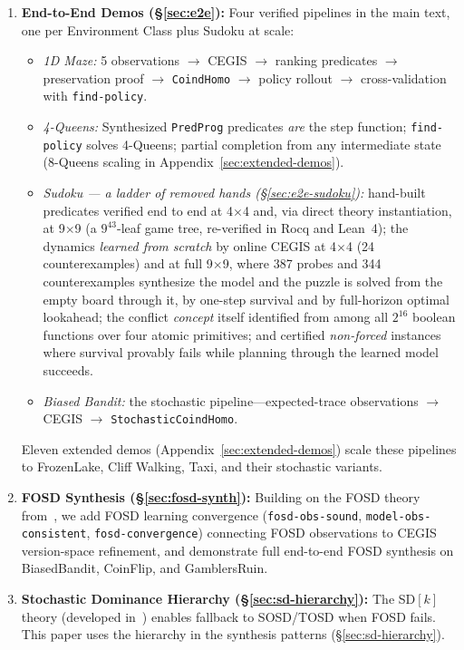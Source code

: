 \documentclass[9pt,a4paper]{article}
\theoremstyle{plain}
\theoremstyle{definition}
\theoremstyle{remark}
\begin{document}
\begin{enumerate}
\item \textbf{End-to-End Demos (\S\ref{sec:e2e}):} Four verified pipelines in the main text, one per Environment Class plus Sudoku at scale:
\begin{itemize}
\item \emph{1D Maze:} 5 observations $\to$ CEGIS $\to$ ranking predicates $\to$ preservation proof $\to$ \texttt{CoindHomo} $\to$ policy rollout $\to$ cross-validation with \texttt{find-policy}.
\item \emph{4-Queens:} Synthesized \texttt{PredProg} predicates \emph{are} the step function; \texttt{find-policy} solves 4-Queens; partial completion from any intermediate state (8-Queens scaling in Appendix~\ref{sec:extended-demos}).
\item \emph{Sudoku --- a ladder of removed hands (\S\ref{sec:e2e-sudoku}):} hand-built predicates verified end to end at 4$\times$4 and, via direct theory instantiation, at 9$\times$9 (a $9^{43}$-leaf game tree, re-verified in Rocq and Lean~4); the dynamics \emph{learned from scratch} by online CEGIS at 4$\times$4 (24 counterexamples) and at full 9$\times$9, where 387 probes and 344 counterexamples synthesize the model and the puzzle is solved from the empty board through it, by one-step survival and by full-horizon optimal lookahead; the conflict \emph{concept} itself identified from among all $2^{16}$ boolean functions over four atomic primitives; and certified \emph{non-forced} instances where survival provably fails while planning through the learned model succeeds.
\item \emph{Biased Bandit:} the stochastic pipeline---expected-trace observations $\to$ CEGIS $\to$ \texttt{StochasticCoindHomo}.
\end{itemize}
Eleven extended demos (Appendix~\ref{sec:extended-demos}) scale these pipelines to FrozenLake, Cliff Walking, Taxi, and their stochastic variants.

\item \textbf{FOSD Synthesis (\S\ref{sec:fosd-synth}):} Building on the FOSD theory from~\cite{CSHRLSuccessor}, we add FOSD learning convergence (\texttt{fosd-obs-sound}, \texttt{model-obs-consistent}, \texttt{fosd-convergence}) connecting FOSD observations to CEGIS version-space refinement, and demonstrate full end-to-end FOSD synthesis on BiasedBandit, CoinFlip, and GamblersRuin.

\item \textbf{Stochastic Dominance Hierarchy (\S\ref{sec:sd-hierarchy}):} The SD$[k]$ theory (developed in~\cite{CSHRLSuccessor}) enables fallback to SOSD/TOSD when FOSD fails.  This paper uses the hierarchy in the synthesis patterns (\S\ref{sec:sd-hierarchy}).


\end{enumerate}
\end{document}
